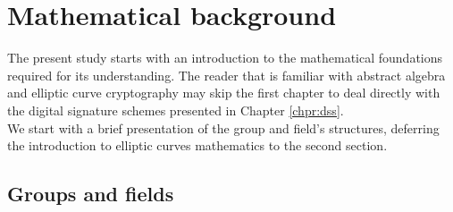 \chapter{Mathematical background}
\label{chpr:math}
The present study starts with an introduction to the mathematical foundations required for its understanding. The reader that is familiar with abstract algebra and elliptic curve cryptography may skip the first chapter to deal directly with the digital signature schemes presented in Chapter \ref{chpr:dss}.
\\
We start with a brief presentation of the group and field's structures, deferring the introduction to elliptic curves mathematics to the second section.

\bigskip

\section{Groups and fields}
\label{chpr:groupsfields}

